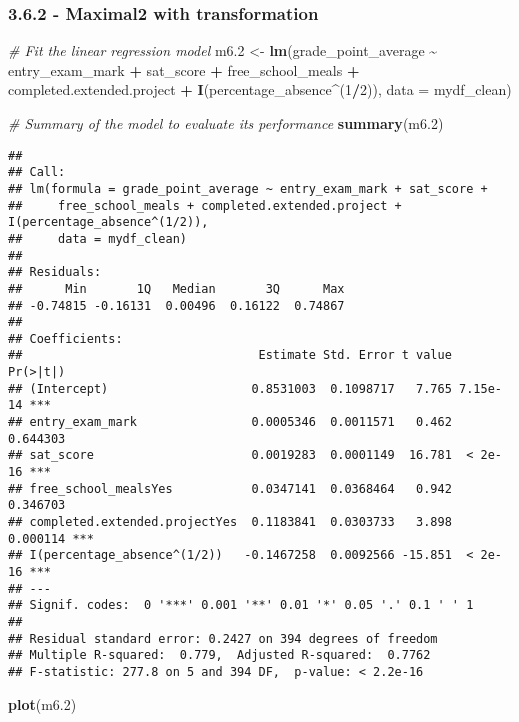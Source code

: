 \documentclass[
]{article}
\newenvironment{Shaded}{\begin{snugshade}}{\end{snugshade}}
\newcommand{\AttributeTok}[1]{\textcolor[rgb]{0.13,0.29,0.53}{#1}}
\newcommand{\CommentTok}[1]{\textcolor[rgb]{0.56,0.35,0.01}{\textit{#1}}}
\newcommand{\DecValTok}[1]{\textcolor[rgb]{0.00,0.00,0.81}{#1}}
\newcommand{\FloatTok}[1]{\textcolor[rgb]{0.00,0.00,0.81}{#1}}
\newcommand{\FunctionTok}[1]{\textcolor[rgb]{0.13,0.29,0.53}{\textbf{#1}}}
\newcommand{\NormalTok}[1]{#1}
\newcommand{\OtherTok}[1]{\textcolor[rgb]{0.56,0.35,0.01}{#1}}
\newcommand{\SpecialCharTok}[1]{\textcolor[rgb]{0.81,0.36,0.00}{\textbf{#1}}}
\begin{document}
\subsubsection{3.6.2 - Maximal2 with
transformation}\label{maximal2-with-transformation}

\begin{Shaded}
\begin{Highlighting}[]
\CommentTok{\# Fit the linear regression model}
\NormalTok{m6}\FloatTok{.2} \OtherTok{\textless{}{-}} \FunctionTok{lm}\NormalTok{(grade\_point\_average }\SpecialCharTok{\textasciitilde{}}\NormalTok{ entry\_exam\_mark }\SpecialCharTok{+}\NormalTok{ sat\_score }\SpecialCharTok{+}\NormalTok{ free\_school\_meals }\SpecialCharTok{+}\NormalTok{ completed.extended.project }\SpecialCharTok{+} \FunctionTok{I}\NormalTok{(percentage\_absence}\SpecialCharTok{\^{}}\NormalTok{(}\DecValTok{1}\SpecialCharTok{/}\DecValTok{2}\NormalTok{)), }\AttributeTok{data =}\NormalTok{ mydf\_clean)}

\CommentTok{\# Summary of the model to evaluate its performance}
\FunctionTok{summary}\NormalTok{(m6}\FloatTok{.2}\NormalTok{)}
\end{Highlighting}
\end{Shaded}

\begin{verbatim}
## 
## Call:
## lm(formula = grade_point_average ~ entry_exam_mark + sat_score + 
##     free_school_meals + completed.extended.project + I(percentage_absence^(1/2)), 
##     data = mydf_clean)
## 
## Residuals:
##      Min       1Q   Median       3Q      Max 
## -0.74815 -0.16131  0.00496  0.16122  0.74867 
## 
## Coefficients:
##                                 Estimate Std. Error t value Pr(>|t|)    
## (Intercept)                    0.8531003  0.1098717   7.765 7.15e-14 ***
## entry_exam_mark                0.0005346  0.0011571   0.462 0.644303    
## sat_score                      0.0019283  0.0001149  16.781  < 2e-16 ***
## free_school_mealsYes           0.0347141  0.0368464   0.942 0.346703    
## completed.extended.projectYes  0.1183841  0.0303733   3.898 0.000114 ***
## I(percentage_absence^(1/2))   -0.1467258  0.0092566 -15.851  < 2e-16 ***
## ---
## Signif. codes:  0 '***' 0.001 '**' 0.01 '*' 0.05 '.' 0.1 ' ' 1
## 
## Residual standard error: 0.2427 on 394 degrees of freedom
## Multiple R-squared:  0.779,  Adjusted R-squared:  0.7762 
## F-statistic: 277.8 on 5 and 394 DF,  p-value: < 2.2e-16
\end{verbatim}

\begin{Shaded}
\begin{Highlighting}[]
\FunctionTok{plot}\NormalTok{(m6}\FloatTok{.2}\NormalTok{)}
\end{Highlighting}
\end{Shaded}
\end{document}

